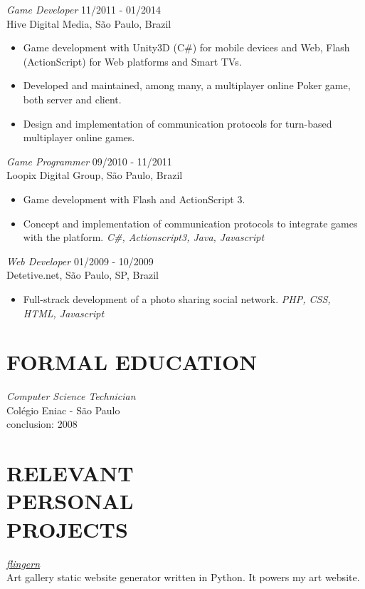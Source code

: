 \documentclass[line,margin]{res}
\begin{document}
\begin{resume}
        {\sl Game Developer} \hfill 11/2011 - 01/2014 \\
                Hive Digital Media, São Paulo, Brazil
        \begin{itemize}  \itemsep 1.25pt
            \item Game development with Unity3D (C\#) for mobile devices and Web, Flash (ActionScript) for Web platforms and Smart TVs.
            \item Developed and maintained, among many, a multiplayer online Poker game, both server and client.
            \item Design and implementation of communication protocols for turn-based multiplayer online games.
        \end{itemize}
                 
        {\sl Game Programmer} \hfill 09/2010 - 11/2011 \\
                Loopix Digital Group, São Paulo, Brazil
        \begin{itemize}  \itemsep 1.25pt
                \item Game development with Flash and ActionScript 3.
                \item Concept and implementation of communication protocols to integrate games with the platform. \textit{C\#, Actionscript3, Java, Javascript}
        \end{itemize}
 
        {\sl Web Developer} \hfill 01/2009 - 10/2009 \\
                Detetive.net, São Paulo, SP, Brazil
        \begin{itemize}  \itemsep 1.25pt
                \item Full-strack development of a photo sharing social network.  \textit{PHP, CSS, HTML, Javascript}
        \end{itemize} 

\section{FORMAL EDUCATION}
        {\sl Computer Science Technician} \\
                Colégio Eniac - São Paulo \\
                conclusion: 2008
                
\section{RELEVANT\\PERSONAL\\PROJECTS}   
        {\sl \href{https://github.com/CrociDB/flingern}{flingern} } \\
            Art gallery static website generator written in Python. It powers my art website.


\end{resume}
\end{document}
